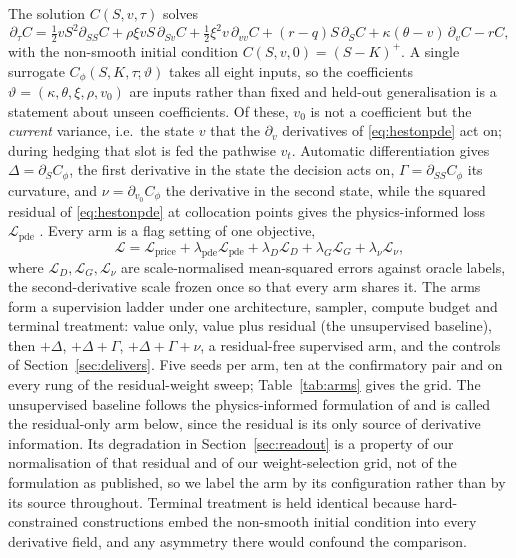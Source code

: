 \documentclass{article}
\begin{document}
The solution $C(S, v, \tau)$ solves
\begin{equation}\label{eq:hestonpde}
\partial_\tau C=\tfrac12 vS^{2}\partial_{SS}C+\rho\xi vS\,\partial_{Sv}C
+\tfrac12\xi^{2}v\,\partial_{vv}C+(r-q)S\,\partial_{S}C
+\kappa(\theta-v)\,\partial_{v}C-rC,
\end{equation}
with the non-smooth initial condition $C(S,v,0)=(S-K)^{+}$. A single surrogate
$C_\phi(S,K,\tau;\vartheta)$ takes all eight inputs, so the coefficients
$\vartheta=(\kappa,\theta,\xi,\rho,v_0)$ are inputs rather than fixed and held-out
generalisation is a statement about unseen coefficients. Of these, $v_0$ is not a
coefficient but the \emph{current} variance, i.e.\ the state $v$ that the
$\partial_v$ derivatives of \eqref{eq:hestonpde} act on; during hedging that slot is
fed the pathwise $v_t$. Automatic differentiation
gives $\Delta=\partial_S C_\phi$, the first derivative in the state the decision
acts on, $\Gamma=\partial_{SS}C_\phi$ its curvature, and $\nu=\partial_{v_0}C_\phi$
the derivative in the second state, while the squared residual of
\eqref{eq:hestonpde} at collocation points gives the physics-informed loss
$\mathcal{L}_{\mathrm{pde}}$ \citep{raissi2019physics}. Every arm is a flag setting
of one objective,
\begin{equation}\label{eq:loss}
\mathcal{L}=\mathcal{L}_{\mathrm{price}}
+\lambda_{\mathrm{pde}}\mathcal{L}_{\mathrm{pde}}
+\lambda_{D}\mathcal{L}_{D}+\lambda_{G}\mathcal{L}_{G}
+\lambda_{\nu}\mathcal{L}_{\nu},
\end{equation}
where $\mathcal{L}_{D},\mathcal{L}_{G},\mathcal{L}_{\nu}$ are scale-normalised
mean-squared errors against oracle labels, the second-derivative scale frozen once so
that every arm shares it. The arms form a supervision ladder under one architecture, sampler, compute budget
and terminal treatment: value only, value plus residual (the unsupervised baseline),
then $+\Delta$, $+\Delta{+}\Gamma$, $+\Delta{+}\Gamma{+}\nu$, a residual-free
supervised arm, and the controls of Section~\ref{sec:delivers}. Five seeds per arm,
ten at the confirmatory pair and on every rung of the residual-weight sweep;
Table~\ref{tab:arms} gives the grid. The unsupervised baseline follows the physics-informed formulation of
\citet{hainaut2024option} and is called the residual-only arm below, since the
residual is its only source of derivative information. Its degradation in
Section~\ref{sec:readout} is a property of our normalisation of that residual and of
our weight-selection grid, not of the formulation as published, so we label the arm
by its configuration rather than by its source throughout. Terminal treatment is held identical because hard-constrained constructions
\citep{lagaris1998artificial} embed the non-smooth initial condition into every
derivative field, and any asymmetry there would confound the comparison.
\end{document}
